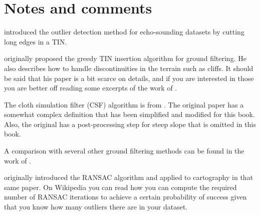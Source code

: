 %
%
%
%
%


%
\section{Notes and comments}

\citet{Arge10} introduced the outlier detection method for echo-sounding datasets by cutting long edges in a TIN\@.

\citet{axelsson2000generation} originally proposed the greedy TIN insertion algorithm for ground filtering.
He also describes how to handle discontinuities in the terrain such as cliffs.
It should be said that his paper is a bit scarce on details, and if you are interested in those you are better off reading some excerpts of the work of \citet{Lin14}. 

The cloth simulation filter (CSF) algorithm is from \citet{Zhang16}.
The original paper has a somewhat complex definition that has been simplified and modified for this book.
Also, the original has a post-processing step for steep slope that is omitted in this book.

A comparison with several other ground filtering methods can be found in the work of \citet{Meng10}.

\citet{Fischler81} originally introduced the RANSAC algorithm and applied to cartography in that same paper. On Wikipedia you can read how you can compute the required number of RANSAC iterations to achieve a certain probability of success given that you know how many outliers there are in your dataset.

